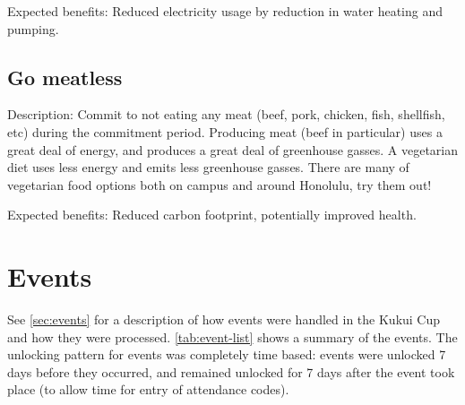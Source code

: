Expected benefits: Reduced electricity usage by reduction in water heating and pumping.


\subsection{Go meatless}

Description: Commit to not eating any meat (beef, pork, chicken, fish, shellfish, etc) during the commitment period. Producing meat (beef in particular) uses a great deal of energy, and produces a great deal of greenhouse gasses. A vegetarian diet uses less energy and emits less greenhouse gasses. There are many of vegetarian food options both on campus and around Honolulu, try them out!

Expected benefits: Reduced carbon footprint, potentially improved health.


\section{Events}

See \autoref{sec:events} for a description of how events were handled in the Kukui Cup and how they were processed. \autoref{tab:event-list} shows a summary of the events. The unlocking pattern for events was completely time based: events were unlocked 7 days before they occurred, and remained unlocked for 7 days after the event took place (to allow time for entry of attendance codes).

